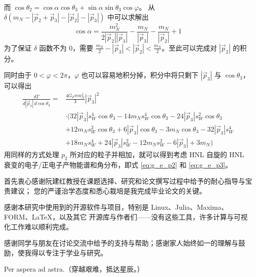 \documentclass[printMode=false, declarePage=false]{ecnuthesis}
\begin{document}
\begin{appendix}
\begin{enumerate}
          而 $\cos{\theta_2} = \cos{\alpha} \cos{\theta_3} + \sin{\alpha} \sin{\theta_3} \cos{\varphi}$。
          从 $\delta(m_N - |\overrightarrow{p}_2 + \overrightarrow{p}_3| - |\overrightarrow{p}_2| - |\overrightarrow{p}_3|)$ 中可以求解出
          \begin{equation}
            \cos{\alpha} = \frac{m_N^2}{2|\overrightarrow{p}_2||\overrightarrow{p}_3|}-\frac{m_N}{|\overrightarrow{p}_3|}-\frac{m_N}{|\overrightarrow{p}_2|}+1
          \end{equation}
          为了保证 $\delta$ 函数不为 0，需要 $ \frac{m_N}{2} - |\overrightarrow{p}_3| < |\overrightarrow{p}_2| < \frac{m_N}{2}$。至此可以完成对 $|\overrightarrow{p}_2|$ 的积分。
          
          同时由于 $0 < \varphi < 2 \pi$，$\varphi$ 也可以容易地积分掉，积分中将只剩下 $|\overrightarrow{p}_3|$ 与 $\cos{\theta_3}$，可以得出
          \begin{equation}
            \begin{split}
              \frac{d \Gamma}{d |\overrightarrow{p}_3| \, d\cos{\theta_3}} = & \frac{4 G_F \pi m_N^2}{3} |\overrightarrow{p}_3|^2                                                                                \\
                                                                             & \cdot (32 |\overrightarrow{p}_3| s_W^4 \cos{\theta_3}-14 m_N s_W^4 \cos{\theta_3} -24 |\overrightarrow{p}_3| s_W^2 \cos{\theta_3} \\
                                                                             & +12 m_N s_W^2 \cos{\theta_3} +6 |\overrightarrow{p}_3| \cos{\theta_3}-3 m_N \cos{\theta_3}-32 |\overrightarrow{p}_3| s_W^4        \\
                                                                             & +18 m_N s_W^4+24 |\overrightarrow{p}_3| s_W^2-12 m_N s_W^2-6 |\overrightarrow{p}_3|+3 m_N)
            \end{split}
          \end{equation}
          用同样的方式处理 $p_2$ 所对应的粒子并相加，就可以得到考虑 HNL 自旋的 HNL 衰变的电子/正电子产物能谱和角分布，即式 \ref{eq:g_e_p2} 和 \ref{eq:g_e_p3}。
          
  \end{enumerate}
  
\end{appendix}

\begin{acknowledgement}
  首先衷心感谢阮建红教授在课题选择、研究和论文撰写过程中给予的耐心指导与宝贵建议；
  您的严谨治学态度和悉心栽培是我完成毕业论文的关键。
  
  感谢本研究中使用到的开源软件与项目，特别是 Linux、Julia、Maxima、FORM、\LaTeX，以及其它
  开源库与作者们——没有这些工具，许多计算与可视化工作难以顺利完成。
  
  感谢同学与朋友在讨论交流中给予的支持与帮助；感谢家人始终如一的理解与鼓励，使我得以专注于学业与研究。
  
  Per aspera ad astra.（穿越艰难，抵达星辰。）
\end{acknowledgement}
\end{document}
